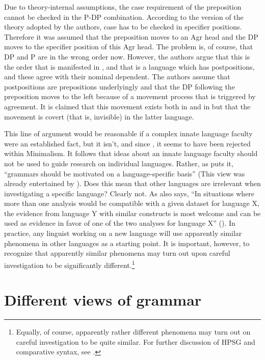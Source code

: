\documentclass[output=paper,biblatex,babelshorthands,newtxmath,draftmode,colorlinks,citecolor=brown]{langscibook}
\begin{document}
Due to theory-internal assumptions, the case requirement of the preposition cannot be checked in the
P-DP combination. According to the version of the theory adopted by the authors, case has to be
checked in specifier positions. Therefore it was assumed that the preposition moves to an Agr head
and the DP moves to the specifier position of this Agr head. The problem is, of course, that DP and P
are in the wrong order now. However, the authors argue that this is the order that is manifested in
, and that  is a language which has postpositions, and these agree with
their nominal dependent. The authors assume that  postpositions are prepositions
underlyingly and that the DP following the preposition moves to the left because of a movement
process that is triggered by agreement. It is claimed that this movement exists both in  and in  but
that the movement is covert (that is, invisible) in the latter language.

This line of argument would be reasonable if a complex innate language
faculty were an established fact, but it isn't, and since \citet*{HCF2002a}, it seems to have been
rejected within Minimalism. It follows that ideas about an innate language faculty should not be
used to guide research on individual languages. Rather, as \citet[25]{MuellerCoreGram} puts it,
``grammars should be motivated on a language-specific basis'' (This view was already entertained by
\citet[, 43]{Boas1911a-u}). Does this mean that other languages are
irrelevant when investigating a specific language? Clearly not. As 
also says, ``In situations where more than one analysis would be compatible with a given dataset
for language X, the evidence from language Y with similar constructs is most welcome and can be used
as evidence in favor of one of the two analyses for language X'' (\citeyear[43]{MuellerCoreGram}). In
practice, any linguist working on a new language will use apparently similar phenomena in other
languages as a starting point. It is important, however, to recognize that apparently similar
phenomena may turn out upon careful investigation to be significantly different.\footnote{%
  Equally, of course, apparently rather different phenomena may turn out on careful investigation to
  be quite similar. For further discussion of HPSG and comparative syntax, see .%
} 

\section{Different views of grammar}
\label{sec:min-views-grammar}
\end{document}
